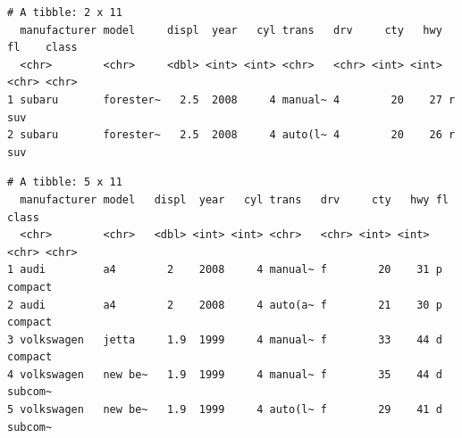 \documentclass[
  11pt,
]{krantz}
\newenvironment{Shaded}{\begin{snugshade}}{\end{snugshade}}
\newcommand{\CommentTok}[1]{\textcolor[rgb]{0.37,0.37,0.37}{\textit{#1}}}
\newcommand{\DecValTok}[1]{\textcolor[rgb]{0.06,0.06,0.06}{#1}}
\newcommand{\KeywordTok}[1]{\textcolor[rgb]{0.27,0.27,0.27}{\textbf{#1}}}
\newcommand{\NormalTok}[1]{#1}
\newcommand{\OperatorTok}[1]{\textcolor[rgb]{0.43,0.43,0.43}{\textbf{#1}}}
\newcommand{\StringTok}[1]{\textcolor[rgb]{0.5,0.5,0.5}{#1}}
\begin{document}
\begin{Shaded}
\end{Shaded}

\begin{verbatim}
# A tibble: 2 x 11
  manufacturer model     displ  year   cyl trans   drv     cty   hwy fl    class
  <chr>        <chr>     <dbl> <int> <int> <chr>   <chr> <int> <int> <chr> <chr>
1 subaru       forester~   2.5  2008     4 manual~ 4        20    27 r     suv  
2 subaru       forester~   2.5  2008     4 auto(l~ 4        20    26 r     suv  
\end{verbatim}

\begin{Shaded}
\end{Shaded}

\begin{verbatim}
# A tibble: 5 x 11
  manufacturer model   displ  year   cyl trans   drv     cty   hwy fl    class  
  <chr>        <chr>   <dbl> <int> <int> <chr>   <chr> <int> <int> <chr> <chr>  
1 audi         a4        2    2008     4 manual~ f        20    31 p     compact
2 audi         a4        2    2008     4 auto(a~ f        21    30 p     compact
3 volkswagen   jetta     1.9  1999     4 manual~ f        33    44 d     compact
4 volkswagen   new be~   1.9  1999     4 manual~ f        35    44 d     subcom~
5 volkswagen   new be~   1.9  1999     4 auto(l~ f        29    41 d     subcom~
\end{verbatim}
\end{document}
